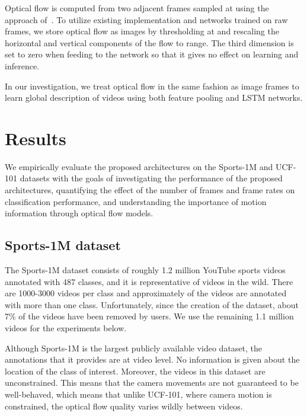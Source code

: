 \documentclass[10pt,twocolumn,letterpaper]{article}
\begin{document}
Optical flow is computed from two adjacent frames sampled at  using the approach of~\cite{zach07}.
To utilize existing implementation and networks trained on raw frames, we store optical flow as images
by thresholding at  and rescaling the horizontal and vertical components of the flow to  range.
The third dimension is set to zero when feeding to the network so that it gives no effect on learning and inference.

 In our investigation, we treat optical flow in the same fashion as image frames to learn global description of videos using both feature pooling and LSTM
networks.



 
\vspace{-1em}
\section{Results}
\vspace{-1em}
\label{sec:results}
We empirically evaluate the proposed architectures on the Sports-1M and UCF-101 datasets with the goals of
investigating the performance of the proposed architectures, quantifying the effect of the number of frames and frame rates on classification
performance, and understanding the importance of motion information through optical flow models.

\vspace{-.6em}
\subsection{Sports-1M dataset}

\vspace{-.6em}
\label{subsec:sports-1m}
The Sports-1M dataset \cite{karpathy2014large} consists of roughly 1.2 million
YouTube sports videos annotated with 487 classes, and it is representative of
videos in the wild. There are 1000-3000 videos per class and approximately
 of the videos are annotated with more than one class. Unfortunately,
since the creation of the dataset, about 7\% of the videos have been removed by
users. We use the remaining 1.1 million videos for the experiments below.

Although Sports-1M is the largest publicly available video dataset,
the annotations that it provides are at video level. No information is
given about the location of the class of interest. Moreover, the videos
in this dataset are unconstrained. This means that the camera movements
are not guaranteed to be well-behaved, which means that unlike UCF-101,
where camera motion is constrained, the optical flow quality varies
wildly between videos.
\end{document}
